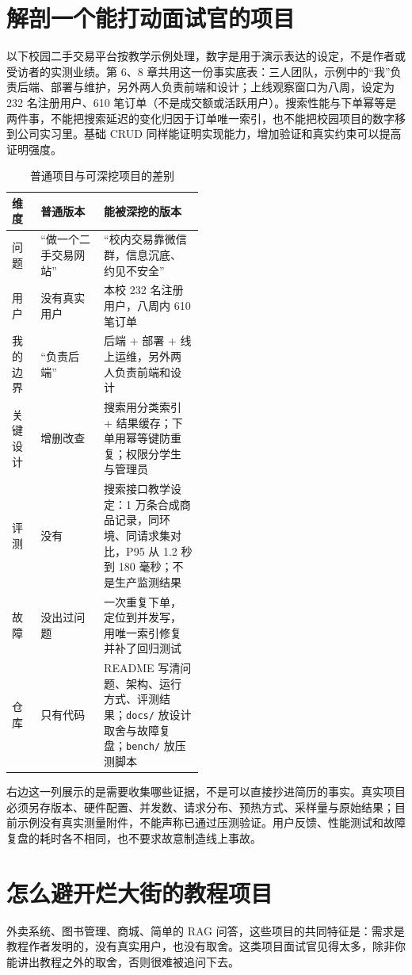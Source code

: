 \documentclass[UTF8,zihao=5,openany]{ctexbook}
\begin{document}
\section{解剖一个能打动面试官的项目}
以下校园二手交易平台按教学示例处理，数字是用于演示表达的设定，不是作者或受访者的实测业绩。第 6、8 章共用这一份事实底表：三人团队，示例中的“我”负责后端、部署与维护，另外两人负责前端和设计；上线观察窗口为八周，设定为 232 名注册用户、610 笔订单（不是成交额或活跃用户）。搜索性能与下单幂等是两件事，不能把搜索延迟的变化归因于订单唯一索引，也不能把校园项目的数字移到公司实习里。基础 CRUD 同样能证明实现能力，增加验证和真实约束可以提高证明强度。

\begin{table}[htbp]
\centering\footnotesize
\caption{普通项目与可深挖项目的差别}
\begin{tabularx}{\linewidth}{p{0.15\linewidth}p{0.33\linewidth}Y}
\toprule
维度 & 普通版本 & 能被深挖的版本 \\
\midrule
问题 & “做一个二手交易网站” & “校内交易靠微信群，信息沉底、约见不安全” \\
用户 & 没有真实用户 & 本校 232 名注册用户，八周内 610 笔订单 \\
我的边界 & “负责后端” & 后端 + 部署 + 线上运维，另外两人负责前端和设计 \\
关键设计 & 增删改查 & 搜索用分类索引 + 结果缓存；下单用幂等键防重复；权限分学生与管理员 \\
评测 & 没有 & 搜索接口教学设定：1 万条合成商品记录，同环境、同请求集对比，P95 从 1.2 秒到 180 毫秒；不是生产监测结果 \\
故障 & 没出过问题 & 一次重复下单，定位到并发写，用唯一索引修复并补了回归测试 \\
仓库 & 只有代码 & README 写清问题、架构、运行方式、评测结果；\texttt{docs/} 放设计取舍与故障复盘；\texttt{bench/} 放压测脚本 \\
\bottomrule
\end{tabularx}
\end{table}

右边这一列展示的是需要收集哪些证据，不是可以直接抄进简历的事实。真实项目必须另存版本、硬件配置、并发数、请求分布、预热方式、采样量与原始结果；目前示例没有真实测量附件，不能声称已通过压测验证。用户反馈、性能测试和故障复盘的耗时各不相同，也不要求故意制造线上事故。

\section{怎么避开烂大街的教程项目}
外卖系统、图书管理、商城、简单的 RAG 问答，这些项目的共同特征是：需求是教程作者发明的，没有真实用户，也没有取舍。这类项目面试官见得太多，除非你能讲出教程之外的取舍，否则很难被追问下去。
\end{document}
